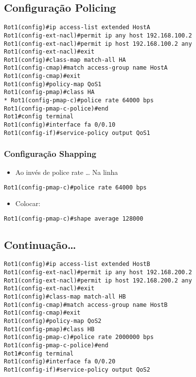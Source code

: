\documentclass[]{article}
\providecommand{\tightlist}{%
  \setlength{\itemsep}{0pt}\setlength{\parskip}{0pt}}
\begin{document}
\hypertarget{configurauxe7uxe3o-policing}{%
\subsection{Configuração Policing}\label{configurauxe7uxe3o-policing}}

\begin{verbatim}
Rot1(config)#ip access-list extended HostA
Rot1(config-ext-nacl)#permit ip any host 192.168.100.2
Rot1(config-ext-nacl)#permit ip host 192.168.100.2 any
Rot1(config-ext-nacl)#exit
Rot1(config)#class-map match-all HA
Rot1(config-cmap)#match access-group name HostA
Rot1(config-cmap)#exit
Rot1(config)#policy-map QoS1
Rot1(config-pmap)#class HA
* Rot1(config-pmap-c)#police rate 64000 bps
Rot1(config-pmap-c-police)#end
Rot1#config terminal
Rot1(config)#interface fa 0/0.10
Rot1(config-if)#service-policy output QoS1
\end{verbatim}

\hypertarget{configurauxe7uxe3o-shapping}{%
\subsubsection{Configuração
Shapping}\label{configurauxe7uxe3o-shapping}}

\begin{itemize}
\tightlist
\item
  Ao invés de police rate \ldots{} Na linha
\end{itemize}

\begin{verbatim}
Rot1(config-pmap-c)#police rate 64000 bps
\end{verbatim}

\begin{itemize}
\tightlist
\item
  Colocar:
\end{itemize}

\begin{verbatim}
Rot1(config-pmap-c)#shape average 128000
\end{verbatim}

\hypertarget{continuauxe7uxe3o}{%
\subsection{Continuação\ldots{}}\label{continuauxe7uxe3o}}

\begin{verbatim}
Rot1(config)#ip access-list extended HostB
Rot1(config-ext-nacl)#permit ip any host 192.168.200.2
Rot1(config-ext-nacl)#permit ip host 192.168.200.2 any
Rot1(config-ext-nacl)#exit
Rot1(config)#class-map match-all HB
Rot1(config-cmap)#match access-group name HostB
Rot1(config-cmap)#exit
Rot1(config)#policy-map QoS2
Rot1(config-pmap)#class HB
Rot1(config-pmap-c)#police rate 2000000 bps
Rot1(config-pmap-c-police)#end
Rot1#config terminal
Rot1(config)#interface fa 0/0.20
Rot1(config-if)#service-policy output QoS2
\end{verbatim}
\end{document}
